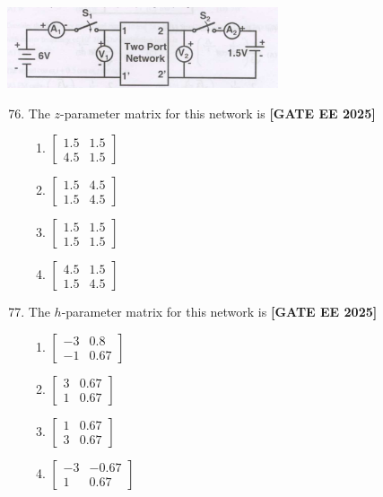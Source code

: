 \documentclass[12pt,a4paper]{article}
\begin{document}
\begin{center}
\includegraphics[width=0.6\textwidth]{figs/q7677.png}
\end{center}

\begin{enumerate}[leftmargin=*, label=\textbf{Q.\arabic*:}]
\setcounter{enumi}{75}

\item The $z$-parameter matrix for this network is
\newline
\noindent \textbf{[GATE EE 2025]}
\begin{enumerate}[label=(\Alph*)]
  \item $\begin{bmatrix} 1.5 & 1.5 \\ 4.5 & 1.5 \end{bmatrix}$
  \item $\begin{bmatrix} 1.5 & 4.5 \\ 1.5 & 4.5 \end{bmatrix}$
  \item $\begin{bmatrix} 1.5 & 1.5 \\ 1.5 & 1.5 \end{bmatrix}$
  \item $\begin{bmatrix} 4.5 & 1.5 \\ 1.5 & 4.5 \end{bmatrix}$
\end{enumerate}

\item The $h$-parameter matrix for this network is
\newline
\noindent \textbf{[GATE EE 2025]}
\begin{enumerate}[label=(\Alph*)]
  \item $\begin{bmatrix} -3 & 0.8 \\ -1 & 0.67 \end{bmatrix}$
  \item $\begin{bmatrix} 3 & 0.67 \\ 1 & 0.67 \end{bmatrix}$
  \item $\begin{bmatrix} 1 & 0.67 \\ 3 & 0.67 \end{bmatrix}$
  \item $\begin{bmatrix} -3 & -0.67 \\ 1 & 0.67 \end{bmatrix}$
\end{enumerate}

\end{enumerate}
\end{document}
